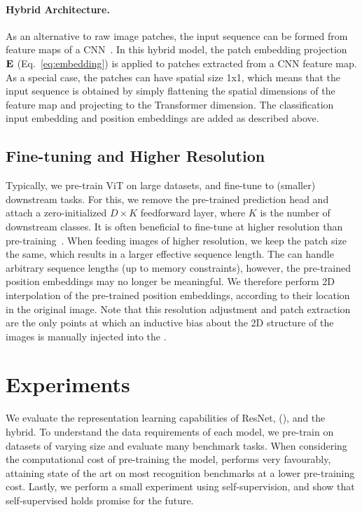 \paragraph{Hybrid Architecture.}
As an alternative to raw image patches, the input sequence can be formed from feature maps of a CNN~\citep{LeCun1989BackpropagationAT}.
In this hybrid model, the patch embedding projection $\mathbf{E}$  (Eq.~\ref{eq:embedding}) is applied to patches extracted from a CNN feature map.
As a special case, the patches can have spatial size 1x1, which means that the input sequence is obtained by simply flattening the spatial dimensions of the feature map and projecting to the Transformer dimension.  
The classification input embedding and position embeddings are added as described above.

\subsection{Fine-tuning and Higher Resolution}

Typically, we pre-train ViT on large datasets, and fine-tune to (smaller) downstream  tasks.
For this, we remove the pre-trained prediction head and attach a zero-initialized $D\times K$ feedforward layer, where $K$ is the number of downstream classes.
It is often beneficial to fine-tune at higher resolution than pre-training~\citep{touvron2019,kolesnikov2020-bit}.
When feeding images of higher resolution, we keep the patch size the same, which results in a larger effective sequence length.
The \oursfull{} can handle arbitrary sequence lengths (up to memory constraints), however, the pre-trained position embeddings may no longer be meaningful.
We therefore perform 2D interpolation of the pre-trained position embeddings, according to their location in the original image.
Note that this resolution adjustment and patch extraction are the only points at which an inductive bias about the 2D structure of the images is manually injected into the \oursfull{}.




\section{Experiments}
We evaluate the representation learning capabilities of ResNet, \oursfull{} (\oursabbrv{}), and the hybrid.
To understand the data requirements of each model, we pre-train on datasets of varying size and evaluate many benchmark tasks.
When considering the computational cost of pre-training the model, \oursabbrv{} performs very favourably, attaining state of the art on most recognition benchmarks at a lower pre-training cost.
Lastly, we perform a small experiment using self-supervision, and show that self-supervised \oursabbrv{} holds promise for the future.

